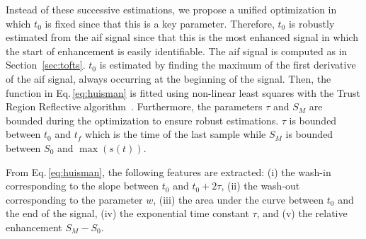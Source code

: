 Instead of these successive estimations, we propose a unified optimization in which $t_0$ is fixed since that this is a key parameter.
Therefore, $t_0$ is robustly estimated from the \ac{aif} signal since that this is the most enhanced signal in which the start of enhancement is easily identifiable.
The \ac{aif} signal is computed as in Section~\ref{sec:tofts}.
$t_0$ is estimated by finding the maximum of the first derivative of the \ac{aif} signal, always occurring at the beginning of the signal.
Then, the function in Eq.\,\eqref{eq:huisman} is fitted using non-linear least squares with the Trust Region Reflective algorithm~\citep{sorensen1982newton}.
Furthermore, the parameters $\tau$ and $S_M$ are bounded during the optimization to ensure robust estimations.
$\tau$ is bounded between $t_0$ and $t_f$ which is the time of the last sample while $S_M$ is bounded between $S_0$ and $\max(s(t))$.


From Eq.\,\eqref{eq:huisman}, the following features are extracted:
(i) the wash-in corresponding to the slope between $t_0$ and $t_0 + 2 \tau$,
(ii) the wash-out corresponding to the parameter $w$,
(iii) the area under the curve between $t_0$ and the end of the signal,
(iv) the exponential time constant $\tau$, and
(v) the relative enhancement $S_M - S_0$.

